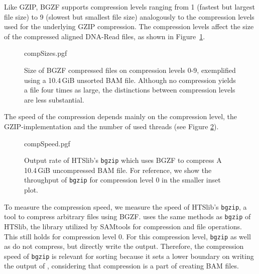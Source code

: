 Like GZIP, BGZF supports compression levels ranging from 1 (fastest but largest file size) to 9 (slowest but smallest file size) analogously to the compression levels used for the underlying GZIP compression. The compression levels affect the size of the compressed aligned DNA-Read files, as shown in Figure~\ref{fig:compSizes}.
\begin{figure}[htb]
        {compSizes.pgf}
    \caption{Size of BGZF compressed files on compression levels 0-9, exemplified using a 10.4\,GiB unsorted BAM file. 
    Although no compression yields a file four times as large, the distinctions between compression levels are less substantial.}
    \label{fig:compSizes}
\end{figure}
The speed of the compression depends mainly on the compression level, the GZIP-implementation and the number of used threads (see Figure \ref{fig:compSpeed}).  
\begin{figure}[htb]
        {compSpeed.pgf}
    \caption{Output rate of HTSlib's \texttt{bgzip} which uses BGZF to compress A 10.4\,GiB uncompressed BAM file. For reference, we show the throughput of \texttt{bgzip} for compression level 0 in the smaller inset plot. \points}
    \label{fig:compSpeed}
\end{figure}
To measure the compression speed, we measure the speed of HTSlib's \texttt{bgzip}, a tool to compress arbitrary files using BGZF. \sort uses the same methods as \texttt{bgzip} of HTSlib, the library utilized by SAMtools for compression and file operations. This still holds for compression level 0. For this compression level, \texttt{bgzip} as well as \sort do not compress, but directly write the output. Therefore, the compression speed of \texttt{bgzip} is relevant for sorting because it sets a lower boundary on writing the output of \sort, considering that compression is a part of creating BAM files.
